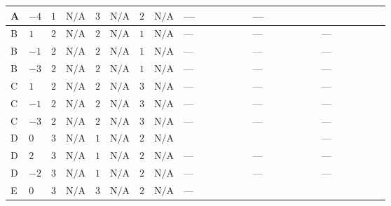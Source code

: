 \documentclass[8pt]{article}
\begin{document}
\begin{landscape}
\begin{longtable}{@{}llcccccc >{\raggedright\arraybackslash}p{0.21\linewidth} >{\raggedright\arraybackslash}p{0.21\linewidth} >{\raggedright\arraybackslash}p{0.21\linewidth}@{}}
\midrule
A & $-4$ & $1$ & $\text{N/A}$ & $3$ & $\text{N/A}$ & $2$ & $\text{N/A}$ & --- & --- & \scriptsize\adjustbox{max width=\linewidth}{$\begin{gathered} -12 {g_2}^2 {m_2^2}\end{gathered}$} \\
\midrule
B & $1$ & $2$ & $\text{N/A}$ & $2$ & $\text{N/A}$ & $1$ & $\text{N/A}$ & --- & --- & --- \\
\midrule
B & $-1$ & $2$ & $\text{N/A}$ & $2$ & $\text{N/A}$ & $1$ & $\text{N/A}$ & --- & --- & --- \\
\midrule
B & $-3$ & $2$ & $\text{N/A}$ & $2$ & $\text{N/A}$ & $1$ & $\text{N/A}$ & --- & --- & --- \\
\midrule
C & $1$ & $2$ & $\text{N/A}$ & $2$ & $\text{N/A}$ & $3$ & $\text{N/A}$ & --- & --- & --- \\
\midrule
C & $-1$ & $2$ & $\text{N/A}$ & $2$ & $\text{N/A}$ & $3$ & $\text{N/A}$ & --- & --- & --- \\
\midrule
C & $-3$ & $2$ & $\text{N/A}$ & $2$ & $\text{N/A}$ & $3$ & $\text{N/A}$ & --- & --- & --- \\
\midrule
D & $0$ & $3$ & $\text{N/A}$ & $1$ & $\text{N/A}$ & $2$ & $\text{N/A}$ & \scriptsize\adjustbox{max width=\linewidth}{$\begin{gathered} 12 {\mu_{\mathrm{T3GeneralS1Sq}}} \left({\lambda_{X_{5}}^{(1)}}\right)^{*}\end{gathered}$} & \scriptsize\adjustbox{max width=\linewidth}{$\begin{gathered} +12 {\lambda_{X_{5}}^{(1)}} \left({\mu_{\mathrm{T3GeneralS1Sq}}}\right)^{*}\end{gathered}$} & --- \\
\midrule
D & $2$ & $3$ & $\text{N/A}$ & $1$ & $\text{N/A}$ & $2$ & $\text{N/A}$ & --- & --- & --- \\
\midrule
D & $-2$ & $3$ & $\text{N/A}$ & $1$ & $\text{N/A}$ & $2$ & $\text{N/A}$ & --- & --- & --- \\
\midrule
E & $0$ & $3$ & $\text{N/A}$ & $3$ & $\text{N/A}$ & $2$ & $\text{N/A}$ & --- & \scriptsize\adjustbox{max width=\linewidth}{$\begin{gathered} +12 {\lambda_{X_{5}}^{(1)}} \left({\mu_{\mathrm{T3GeneralS1Sq}}}\right)^{*} \\ +4 {\lambda_{X_{5}}^{(2)}} \left({\mu_{\mathrm{T3GeneralS1Sq}}}\right)^{*}\end{gathered}$} & \scriptsize\adjustbox{max width=\linewidth}{$\begin{gathered} -12 {g_2}^2 {m_2^2}\end{gathered}$} \\

\end{longtable}
\end{landscape}
\end{document}
